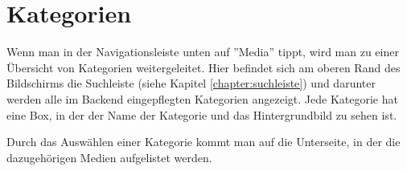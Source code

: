 \section{Kategorien}

Wenn man in der Navigationsleiste unten auf ''Media'' tippt, wird man zu einer Übersicht von Kategorien weitergeleitet.
Hier befindet sich am oberen Rand des Bildschirms die Suchleiste (siehe Kapitel \ref{chapter:suchleiste}) und darunter
werden alle im Backend eingepflegten Kategorien angezeigt. Jede Kategorie hat eine Box, in der der Name der Kategorie
und das Hintergrundbild zu sehen ist.

Durch das Auswählen einer Kategorie kommt man auf die Unterseite, in der die dazugehörigen Medien aufgelistet werden.

\begin{figure}[H]
    \begin{minipage}{0.5\textwidth}
        \centering

\end{minipage}
\end{figure}
